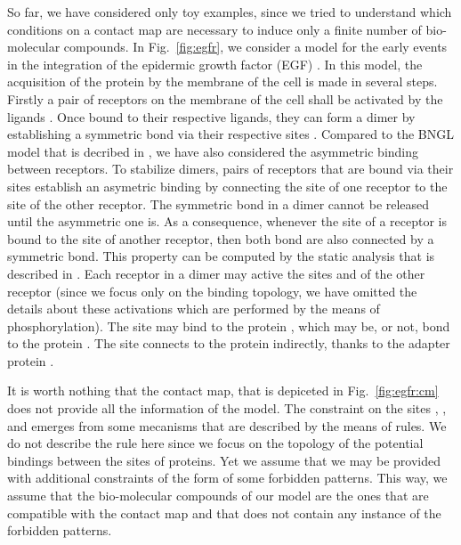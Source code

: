 \documentclass{entcs}
\begin{document}
So far, we have considered only toy examples, since we tried to understand which conditions on a contact map are necessary to induce only a finite number of bio-molecular compounds. In Fig.~\ref{fig:egfr}, we consider
a model for the early events in the integration of the epidermic growth factor (EGF) \cite{Blinov-2006-ANM}. In this model, the acquisition of the protein  by the membrane of the cell is made in several steps.
Firstly a pair of receptors  on the membrane of the cell shall be activated by the ligands . Once bound to their respective ligands, they can form a dimer by establishing a symmetric bond via their respective sites
. Compared to the BNGL model that is decribed in \cite{Blinov-2006-ANM}, we have also considered the asymmetric binding between receptors. To stabilize dimers, pairs of receptors that are bound via their sites  establish an asymetric binding by connecting the site  of one receptor to the site  of the other receptor. The symmetric bond in a dimer cannot be released until the asymmetric one is. As a consequence, whenever the site  of a receptor is bound to the site  of another receptor, then both bond are also connected by a symmetric bond. This property can be computed
by the static analysis that is described in \cite{SASB2016,KaSa}.
Each receptor in a dimer may active the sites  and  of the other receptor (since we focus only on the binding topology, we have omitted the details about these activations which are performed by the means of phosphorylation). The site  may bind to the protein , which may be, or not, bond to the protein
. The site  connects to the protein  indirectly, thanks to the adapter protein .

It is worth nothing that the contact map, that is depiceted in Fig.~\ref{fig:egfr:cm} does not provide all the information of the model.
The constraint on the sites , , and  emerges from some mecanisms that are described by the means of rules.
We do not describe the rule here since we focus on the topology of the potential bindings between the sites of proteins. Yet we assume that we may be provided with additional constraints of the form of some forbidden patterns. This way, we assume that the bio-molecular compounds of our model are the ones that are compatible with the contact map and that does not contain any instance of the forbidden patterns.
\end{document}
